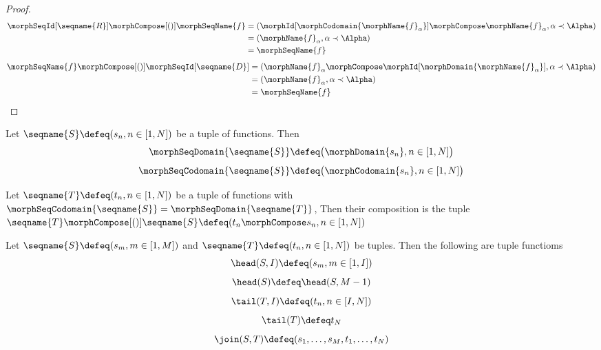 \documentclass{article}
\begin{document}
\begin{lemma}
\begin{proof}
\begin{equation*}
\begin{split}
  \morphSeqId[\seqname{R}] \morphCompose[()] \morphSeqName{f}
  & =
  (\morphId[\morphCodomain{\morphName{f}_\alpha}] \morphCompose \morphName{f}_\alpha,
\alpha \prec \Alpha)
\\*
  & =
  (\morphName{f}_\alpha, \alpha \prec \Alpha)
\\*
  & =
  \morphSeqName{f}
\end{split}
\end{equation*}
\begin{equation*}
\begin{split}
  \morphSeqName{f} \morphCompose[()] \morphSeqId[\seqname{D}]
  & =
  (\morphName{f}_\alpha \morphCompose \morphId[\morphDomain{\morphName{f}_\alpha}],
\alpha \prec \Alpha)
\\*
  & =
  (\morphName{f}_\alpha, \alpha \prec \Alpha)
\\*
  & =
  \morphSeqName{f}
\end{split}
\end{equation*}
\end{proof}
\end{lemma}

\begin{definition}
Let $\seqname{S} \defeq (s_n, n \in [1,N])$ be a tuple of functions. Then
\begin{equation}
\morphSeqDomain{\seqname{S}} \defeq \bigl ( \morphDomain{s_n}, n \in [1,N] \bigr )
\end{equation}
\begin{equation}
\morphSeqCodomain{\seqname{S}} \defeq \bigl ( \morphCodomain{s_n}, n \in [1,N] \bigr )
\end{equation}

Let $\seqname{T} \defeq (t_n, n \in [1,N])$ be a tuple of functions with
$\morphSeqCodomain{\seqname{S}}=\morphSeqDomain{\seqname{T}}$,
Then their composition is the tuple
$
  \seqname{T} \morphCompose[()] \seqname{S} \defeq
  (t_n \morphCompose s_n, n \in [1,N])
$

Let $\seqname{S} \defeq (s_m, m \in [1,M])$ and
$\seqname{T} \defeq (t_n, n \in [1,N])$ be tuples.
Then the following are tuple functioms
\begin{equation}
\head(S,I) \defeq (s_m, m \in [1,I])
\end{equation}
\begin{equation}
\head(S) \defeq \head(S,M-1)
\end{equation}
\begin{equation}
\tail(T,I) \defeq (t_n, n \in [I,N])
\end{equation}
\begin{equation}
\tail(T) \defeq t_N
\end{equation}
\begin{equation}
\join(S,T) \defeq (s_1, \dots, s_M, t_1, \dots, t_N)
\end{equation}
\end{definition}
\end{document}
